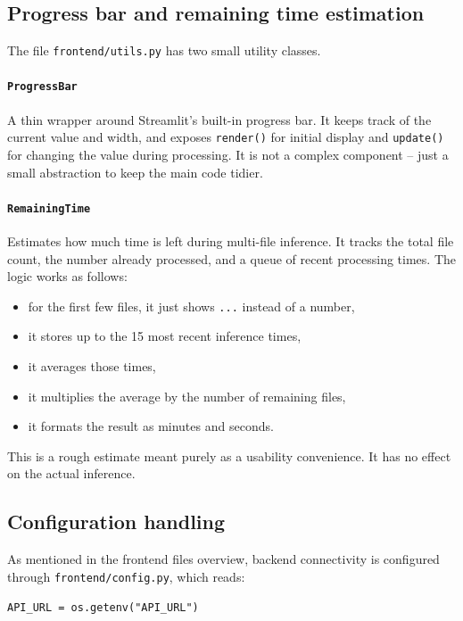 \documentclass{article}
\begin{document}
\subsection{Progress bar and remaining time estimation}

The file \texttt{frontend/utils.py} has two small utility classes.

\paragraph{\texttt{ProgressBar}}
A thin wrapper around Streamlit's built-in progress bar. It keeps track of the current value and width, and exposes \texttt{render()} for initial display and \texttt{update()} for changing the value during processing. It is not a complex component -- just a small abstraction to keep the main code tidier.

\paragraph{\texttt{RemainingTime}}
Estimates how much time is left during multi-file inference. It tracks the total file count, the number already processed, and a queue of recent processing times. The logic works as follows:

\begin{itemize}
    \item for the first few files, it just shows \texttt{...} instead of a number,
    \item it stores up to the 15 most recent inference times,
    \item it averages those times,
    \item it multiplies the average by the number of remaining files,
    \item it formats the result as minutes and seconds.
\end{itemize}

This is a rough estimate meant purely as a usability convenience. It has no effect on the actual inference.

\subsection{Configuration handling}

As mentioned in the frontend files overview, backend connectivity is configured through \texttt{frontend/config.py}, which reads:

\begin{center}
\texttt{API\_URL = os.getenv("API\_URL")}
\end{center}
\end{document}
